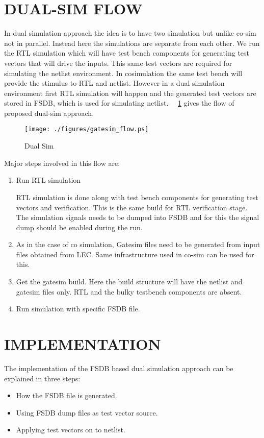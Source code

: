 \section {DUAL-SIM FLOW}
In dual simulation approach the idea is to have two simulation but unlike co-sim not in parallel.  Instead here the simulations are separate from each other. We run the RTL simulation which will have test bench components for generating test vectors that will drive the inputs. This same test vectors are required for simulating the netlist environment. In cosimulation the same test bench will provide the stimulus to RTL and netlist. However in a dual simulation environment first RTL simulation will happen and the generated test vectors are stored in FSDB, which is used for simulating netlist. ~\figurename{~\ref{fig:gatesim_flow.ps}} gives the flow of proposed dual-sim approach.  
\begin{figure}[h]
\centering
\texttt{[image: ./figures/gatesim\_flow.ps]}
\caption{Dual Sim}
\label{fig:gatesim_flow.ps}
\end{figure}

Major steps involved in this flow are:

\begin{enumerate}
	\item Run RTL simulation

	RTL simulation is done along with test bench components for generating test vectors and verification. This is the same build for RTL verification stage. The simulation signals needs to be dumped into FSDB and for this the signal dump should be enabled during the run.
	\item As in the case of co simulation, Gatesim files need to be generated from input files obtained from LEC. Same infrastructure used in co-sim can be used for this.
	\item Get the gatesim build. Here the build structure will have the netlist and gatesim files only. RTL and the bulky testbench components are absent.
	\item Run simulation with specific FSDB file.
\end{enumerate}


\section{IMPLEMENTATION}
The implementation of the FSDB based dual simulation approach can be explained in three steps:
\begin{itemize}
\item How the FSDB file is generated.
\item Using FSDB dump files as test vector source.
\item Applying test vectors on to netlist.
\end{itemize}

